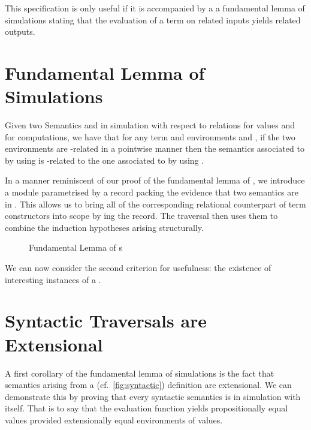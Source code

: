 
This specification is only useful if it is accompanied by a a fundamental lemma of
simulations stating that the evaluation of a term on related inputs yields related
outputs.

\section{Fundamental Lemma of Simulations}

Given two Semantics  and  in simulation with respect to relations
 for values and  for computations, we have that for any term 
and environments  and , if the two environments are -related
in a pointwise manner then the semantics associated to  by  using 
is -related to the one associated to  by  using .

In a manner reminiscent of our proof of the fundamental lemma of , we
introduce a  module parametrised by a record packing the evidence
that two semantics are in . This allows us to bring all of the
corresponding relational counterpart of term constructors into scope by ing
the record. The traversal then uses them to combine the induction hypotheses arising
structurally.

\begin{figure}[h]
\caption{Fundamental Lemma of s\label{fig:fundsim}}
\end{figure}

We can now consider the second criterion for usefulness: the existence of interesting
instances of a .

\section{Syntactic Traversals are Extensional}

A first corollary of the fundamental lemma of simulations is the fact that semantics
arising from a  (cf.~\cref{fig:syntactic}) definition are extensional. We
can demonstrate this by proving that every syntactic semantics is in simulation with
itself. That is to say that the evaluation function yields propositionally equal
values provided extensionally equal environments of values.

